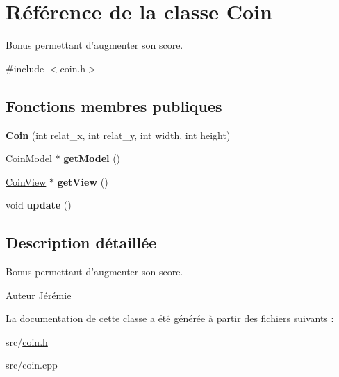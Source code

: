 \hypertarget{class_coin}{\section{Référence de la classe Coin}
\label{class_coin}
}


Bonus permettant d'augmenter son score.  




{\ttfamily \#include $<$coin.\+h$>$}

\subsection*{Fonctions membres publiques}
\begin{DoxyCompactItemize}
\item 
\hypertarget{class_coin_abe56cc85a9b3cde78b2a5d465ab6203a}{{\bfseries Coin} (int relat\+\_\+x, int relat\+\_\+y, int width, int height)}\label{class_coin_abe56cc85a9b3cde78b2a5d465ab6203a}

\item 
\hypertarget{class_coin_ab89ad78608e6ec029b17deb1436973f6}{\hyperlink{class_coin_model}{Coin\+Model} $\ast$ {\bfseries get\+Model} ()}\label{class_coin_ab89ad78608e6ec029b17deb1436973f6}

\item 
\hypertarget{class_coin_ad70bcee90536f3cd6652d3aed80facac}{\hyperlink{class_coin_view}{Coin\+View} $\ast$ {\bfseries get\+View} ()}\label{class_coin_ad70bcee90536f3cd6652d3aed80facac}

\item 
\hypertarget{class_coin_aff7cb8d15f59b0ee3b2a7acb29198eb1}{void {\bfseries update} ()}\label{class_coin_aff7cb8d15f59b0ee3b2a7acb29198eb1}

\end{DoxyCompactItemize}


\subsection{Description détaillée}
Bonus permettant d'augmenter son score. 

\begin{DoxyAuthor}{Auteur}
Jérémie 
\end{DoxyAuthor}


La documentation de cette classe a été générée à partir des fichiers suivants \+:\begin{DoxyCompactItemize}
\item 
src/\hyperlink{coin_8h}{coin.\+h}\item 
src/coin.\+cpp\end{DoxyCompactItemize}
